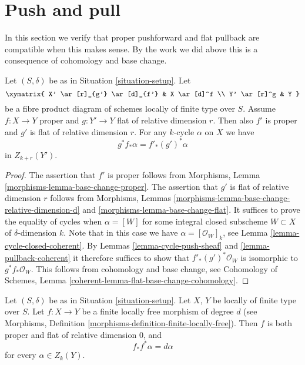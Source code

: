 \section{Push and pull}
\label{section-push-pull}

\noindent
In this section we verify that proper pushforward and flat pullback
are compatible when this makes sense. By the work we did above this
is a consequence of cohomology and base change.

\begin{lemma}
\label{lemma-flat-pullback-proper-pushforward}
Let $(S, \delta)$ be as in Situation \ref{situation-setup}.
Let
$$
\xymatrix{
X' \ar[r]_{g'} \ar[d]_{f'} & X \ar[d]^f \\
Y' \ar[r]^g & Y
}
$$
be a fibre product diagram of schemes locally of finite type over $S$.
Assume $f : X \to Y$ proper and $g : Y' \to Y$ flat of relative dimension $r$.
Then also $f'$ is proper and $g'$ is flat of relative dimension $r$.
For any $k$-cycle $\alpha$ on $X$ we have
$$
g^*f_*\alpha = f'_*(g')^*\alpha
$$
in $Z_{k + r}(Y')$.
\end{lemma}

\begin{proof}
The assertion that $f'$ is proper follows from
Morphisms, Lemma \ref{morphisms-lemma-base-change-proper}.
The assertion that $g'$ is flat of relative dimension $r$ follows from
Morphisms, Lemmas \ref{morphisms-lemma-base-change-relative-dimension-d}
and \ref{morphisms-lemma-base-change-flat}.
It suffices to prove the equality of cycles when $\alpha = [W]$
for some integral closed subscheme $W \subset X$ of $\delta$-dimension $k$.
Note that in this case we have $\alpha = [\mathcal{O}_W]_k$, see
Lemma \ref{lemma-cycle-closed-coherent}.
By Lemmas \ref{lemma-cycle-push-sheaf} and
\ref{lemma-pullback-coherent} it therefore suffices
to show that $f'_*(g')^*\mathcal{O}_W$ is isomorphic to
$g^*f_*\mathcal{O}_W$. This follows from cohomology and
base change, see
Cohomology of Schemes, Lemma \ref{coherent-lemma-flat-base-change-cohomology}.
\end{proof}

\begin{lemma}
\label{lemma-finite-flat}
Let $(S, \delta)$ be as in Situation \ref{situation-setup}.
Let $X$, $Y$ be locally of finite type over $S$.
Let $f : X \to Y$ be a finite locally free morphism
of degree $d$ (see
Morphisms, Definition \ref{morphisms-definition-finite-locally-free}).
Then $f$ is both proper and flat of relative dimension $0$, and
$$
f_*f^*\alpha = d\alpha
$$
for every $\alpha \in Z_k(Y)$.
\end{lemma}

